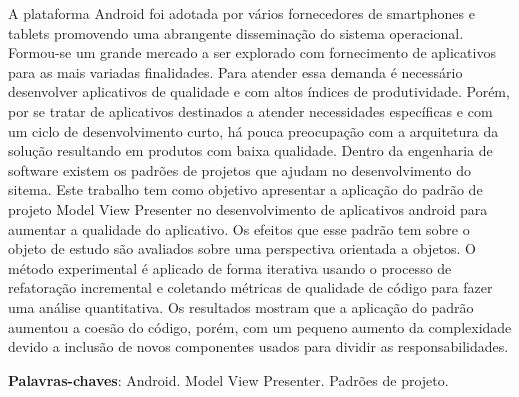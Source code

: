 \documentclass[
	12pt,				%
	a4paper,			%
	oneside,
	english,			%
	brazil,				%
	]{abntex2}
\begin{document}
\pretextual

\imprimircapa 

\imprimirfolhaderosto* 


\begin{resumo}
\noindent
A plataforma Android foi adotada por vários fornecedores de smartphones e
tablets promovendo uma abrangente disseminação do sistema operacional.
Formou-se um grande mercado a ser explorado com fornecimento de aplicativos para
as mais variadas finalidades. Para atender essa demanda é necessário
desenvolver aplicativos de qualidade e com altos índices de produtividade. Porém, por
se tratar de aplicativos destinados a atender necessidades específicas e com um
ciclo de desenvolvimento curto, há pouca preocupação com a arquitetura da
solução resultando em produtos com baixa qualidade. Dentro da engenharia de
software existem os padrões de projetos que ajudam no desenvolvimento do sitema.
Este trabalho tem como objetivo apresentar a aplicação do padrão de projeto
Model View Presenter no desenvolvimento de aplicativos android para aumentar a
qualidade do aplicativo. Os efeitos que esse padrão tem sobre o objeto de estudo
são avaliados sobre uma perspectiva orientada a objetos. O método experimental é
aplicado de forma iterativa usando o processo de refatoração incremental e
coletando métricas de qualidade de código para fazer uma análise quantitativa.
Os resultados mostram que a aplicação do padrão aumentou a coesão do código,
porém, com um pequeno aumento da complexidade devido a inclusão de novos
componentes usados para dividir as responsabilidades.

\vspace{\onelineskip}

\noindent
\textbf{Palavras-chaves}: Android. Model View Presenter. Padrões de projeto.
\end{resumo}
\end{document}
